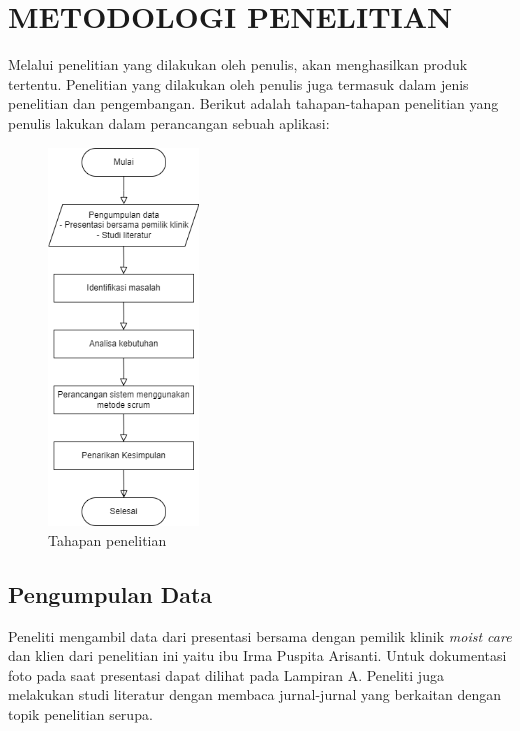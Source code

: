
\chapter{METODOLOGI PENELITIAN}

Melalui penelitian yang dilakukan oleh penulis, akan menghasilkan produk tertentu. Penelitian yang dilakukan oleh penulis juga termasuk dalam jenis penelitian dan pengembangan. Berikut adalah tahapan-tahapan penelitian yang penulis lakukan dalam perancangan sebuah aplikasi:

\begin{figure}[H]
	\centering
	\includegraphics[width=4cm]{gambar/tahapan penelitian fix.png}
	\caption{Tahapan penelitian} 
	\label{Gambar:usecaseadminjurnalpertama}
\end{figure}

\section{Pengumpulan Data}

Peneliti mengambil data dari presentasi bersama dengan pemilik klinik \emph{moist care} dan klien dari penelitian ini yaitu ibu Irma Puspita Arisanti. Untuk dokumentasi foto pada saat presentasi dapat dilihat pada Lampiran A. Peneliti juga melakukan studi literatur dengan membaca jurnal-jurnal yang berkaitan dengan topik penelitian serupa. 

